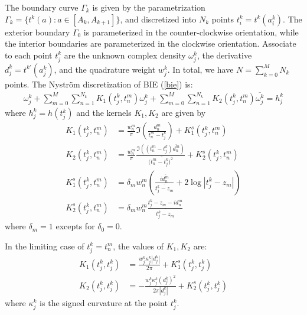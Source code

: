 \documentclass[10pt,twocolumn,letterpaper]{article}
\begin{document}
The boundary curve $\Gamma_k$ is given by the parametrization $\Gamma_k = \{
  t^k(a): a\in \left[A_k,A_{k+1}\right]\}$, 
  and discretized into $N_k$ points $t^k_i = t^k(a^k_i)$.
The exterior boundary $\Gamma_0$ is parameterized in the counter-clockwise orientation, while the interior boundaries
are parameterized in the clockwise orientation.
Associate to each point $t^k_j$ are the unknown complex density $\omega^k_j$, 
  the derivative $d^k_j = t^{k\prime}(a^k_j)$, 
  and the quadrature weight $w^k_j$. 
In total, we have $N= \sum_{k=0}^M N_k$ points. 
The Nystr\"om discretization of BIE (\ref{bie}) is:
\begin{align}
  \omega_j^k
  + \sum_{m=0}^{M}\sum_{n=1}^{N_k} K_1(t^k_j,t^m_n) \omega^k_j
  + \sum_{m=0}^{M}\sum_{n=1}^{N_k} K_2(t^k_j,t^m_n) \overline{\omega^k_j} = h^k_j
  \label{nystrom}
\end{align} where $h^k_j = h(t^k_j)$ and the kernels $K_1, K_2$ are given by
\begin{align}
  K_1(t^k_j, t^m_n)
   & = \frac{w^m_n}{\pi} \Im (\frac{d^m_n}{t^m_n-t^k_j}) + K_1^s(t^k_j,t^m_n)\\
  K_2(t^k_j, t^m_n)
   & = \frac{w^m_n}{\pi} \frac{\Im((t^m_n-t^k_j)\overline{d^m_n})}{(\overline{t^m_n - t^k_j)^2}}  + K_2^s(t^k_j,t^m_n)\\
  K_1^s(t^k_j,t^m_n) 
    & = \delta_m w^m_n \left(\frac{i\overline{d^m_n}}{\overline{t^k_j - z_m}}
    + 2 \log |t^k_j - z_m| \right)\\
  K_2^s(t^k_j,t^m_n) 
    & = \delta_{m}w^m_n \frac{t^k_j-z_m-id^m_n}{\overline{t^k_j - z_m}}
\end{align}
where $\delta_m = 1$ excepts for $\delta_0 = 0$. 

In the limiting case of $t^k_j = t^m_n$, the values of $K_1,K_2$ are:
\begin{align}
  K_1(t^k_j, t^k_j) 
    & = \frac{w^k_j \kappa^k_j|d^k_j|}{2\pi} + K_1^s(t^k_j,t^k_j)\\
  K_2(t^k_j, t^k_j) 
    & = -\frac{w^k_j\kappa^k_j(d^k_j)^2}{2\pi|d^k_j|} + K_2^s(t^k_j,t^k_j)
\end{align}where $\kappa^k_j$ is the signed curvature at the point $t^k_j$.
\end{document}
